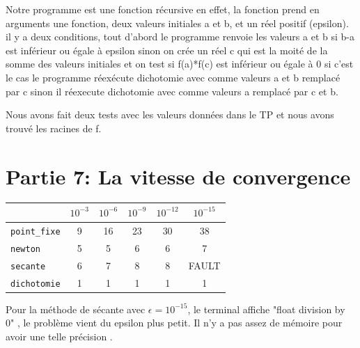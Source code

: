 \documentclass{article}
\begin{document}
Notre programme est une fonction récursive en effet, la fonction prend en arguments une fonction, deux valeurs initiales a et b, et un réel positif (epsilon). il y a deux conditions, tout d'abord le programme renvoie les valeurs a et b si b-a est inférieur ou égale à epsilon sinon on crée un réel c qui est la moité de la somme des valeurs initiales  et on test si f(a)*f(c) est inférieur ou égale à 0 si c'est le cas le programme réexécute dichotomie avec comme valeurs a et b remplacé par c sinon il réexecute dichotomie avec comme valeurs a remplacé par c et b. 

Nous avons fait deux tests avec les valeurs données dans le TP et nous avons trouvé les racines de f. 

\section{Partie 7: La vitesse de convergence }
\begin{center}
\begin{tabular}{l | c c c c c}
{} & $10^{-3}$ & $10^{-6}$ & $10^{-9}$ & $10^{-12}$ & $10^{-15}$ \\
\hline
\texttt{point\_fixe} & {9} & {16} & {23} & {30} & {38} \\
\texttt{newton} & {5} & {5} & {6} & {6} & {7} \\
\texttt{secante} & {6} & {7} & {8} & {8} & {FAULT} \\
\texttt{dichotomie} & {1} & {1} & {1} & {1} & {1} 
\end{tabular}
\end{center}

Pour la méthode de sécante avec $\epsilon = 10^{-15}$, le terminal affiche "float division by 0" , le problème vient du epsilon plus petit. Il n'y a pas assez de mémoire pour avoir une telle précision .
\end{document}
